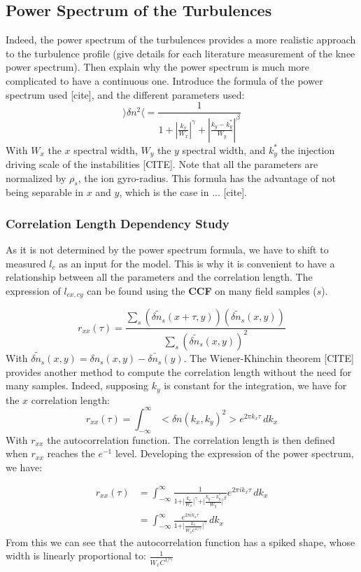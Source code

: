 \documentclass[11pt,a4paper,openany]{report}
\begin{document}
\begin{multicols}{2}
    \subsection{Power Spectrum of the Turbulences}

    Indeed, the power spectrum of the turbulences provides a more realistic approach to the turbulence profile (give details for each literature measurement of the knee power spectrum). Then explain why the power spectrum is much more complicated to have a continuous one. Introduce the formula of the power spectrum used [cite], and the different parameters used:
    $$
        \rangle\delta n^2 \langle = \frac{1}{1 + \left| \frac{k_x}{W_x} \right|^\gamma + \left| \frac{k_y - k_y^*}{W_y} \right|^\beta}
    $$
    With $W_x$ the $x$ spectral width, $W_y$ the $y$ spectral width, and $k_y^*$ the injection driving scale of the instabilities [CITE]. Note that all the parameters are normalized by $\rho_s$, the ion gyro-radius. This formula has the advantage of not being separable in $x$ and $y$, which is the case in ... [cite].

    \subsubsection{Correlation Length Dependency Study}

    As it is not determined by the power spectrum formula, we have to shift to measured $l_c$ as an input for the model. This is why it is convenient to have a relationship between all the parameters and the correlation length. The expression of $l_{cx,cy}$ can be found using the \textbf{CCF} on many field samples ($s$).

    $$
        r_{xx}(\tau) = \frac{\sum_{s}\left(\tilde{\delta n_s}(x + \tau, y)\right)\left(\tilde{\delta n_s}(x, y)\right)}{\sum_{s}\left(\tilde{\delta n_s}(x, y)\right)^2}
    $$
    With $\tilde{\delta n_s}(x,y) = \delta n_s(x,y) - \bar{\delta n_s}(y)$. The Wiener-Khinchin theorem [CITE] provides another method to compute the correlation length without the need for many samples. Indeed, supposing $k_y$ is constant for the integration, we have for the $x$ correlation length:
    $$
        r_{xx}(\tau) = \int_{-\infty}^{\infty} <\delta n(k_x, k_y)^2> e^{2 \pi k_x \tau} \, dk_x
    $$
    With $r_{xx}$ the autocorrelation function. The correlation length is then defined when $r_{xx}$ reaches the $e^{-1}$ level. Developing the expression of the power spectrum, we have:

    \begin{align}
        r_{x x}(\tau) & = \int_{-\infty}^{\infty} \frac{1}{1 + \vert \frac{k_x}{W_x} \vert^\gamma + \vert \frac{k_y - k_y^*}{W_y}\vert^\beta} e^{2 \pi i k_x \tau} \, dk_x \\
                      & = \int_{-\infty}^{\infty} \frac{e^{2 \pi i k_x \tau}}{1 + \vert \frac{k_x}{W_x C^{1/ \gamma}} \vert^\gamma} \, dk_x
    \end{align}
    From this we can see that the autocorrelation function has a spiked shape, whose width is linearly proportional to:
    $\frac{1}{W_x C^{1/ \gamma}}$


\end{multicols}
\end{document}
